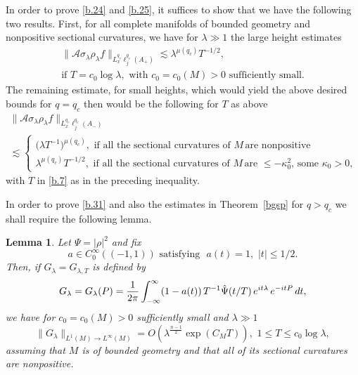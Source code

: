 \documentclass[10pt]{amsart}
\newtheorem{lemma}[theorem]{Lemma}
\newcommand{\la}{\lambda}
\newcommand{\1}{{\bf 1}}
\newcommand{\A}{{\mathcal A}}
\begin{document}
In order to prove \eqref{b.24} and \eqref{b.25},
it suffices to show that
we have the following two results.  First, for
all complete manifolds of bounded 
geometry and  nonpositive 
sectional curvatures, we have for $\la \gg 1$
the large height estimates
\begin{multline}\label{b.31}
\|\A \sigma_\la\rho_\la f\|_{L^{q_c}_x
\ell_j^{q_c}(A_+)}
\lesssim \la^{\mu(q_c)}T^{-1/2}, 
\\ \text{if } T=c_0\log\la,
\, \, 
\text{with }c_0=c_0(M)>0 \, 
\, \text{sufficiently small.}
\end{multline}
The remaining estimate, for small heights, 
which would yield the above
desired bounds for $q=q_c$ then would be the following
for $T$ as above
\begin{multline}\label{b.32}
\|\A \sigma_\la\rho_\la f\|_{L^{q_c}_x
\ell_j^{q_c}(A_-)}
\\
\lesssim
\begin{cases}
\bigl(\la T^{-1}\bigr)^{\mu(q_c)}, 
\, \, \text{if all the sectional curvatures of } 
M \, \text{are nonpositive}
\\
\la^{\mu(q_c)}T^{-1/2}, 
\, \, \text{if all the sectional curvatures of } 
M \, \text{are } \le -\kappa_0^2, \,
\text{some }\kappa_0>0,
\end{cases}
\end{multline}
with $T$ in \eqref{b.7} as in the preceding inequality.


In order to prove \eqref{b.31} and also the estimates
in Theorem~\ref{bgsp} for $q>q_c$ we shall require
the following lemma.


\begin{lemma}\label{Gl}
Let $\Psi=|\rho|^2$ and fix 
$$a\in C^\infty_0((-1,1)) \, \, 
\text{satisfying } \, \, a(t)=1, \, \, 
|t|\le 1/2.$$
Then, if $G_\la=G_{\la,T}$ is defined by
\begin{equation}\label{b.33}
G_\la=G_\la(P)
=\frac1{2\pi}\int_{-\infty}^\infty
(1-a(t))
\, T^{-1}\Hat \Psi(t/T) \,
e^{it\la} \, e^{-itP} \, dt, 
\end{equation}
we have for $c_0=c_0(M)>0$ sufficiently small
and $\la\gg 1$
\begin{equation}\label{b.34}
\|G_\la\|_{L^1(M)\to L^\infty(M)}= 
O(\la^{\frac{n-1}2}\exp(C_MT)),
\, \, 1\le T\le c_0\log\la,
\end{equation}
assuming that $M$ is of bounded geometry and that
all of its sectional curvatures are nonpositive.
\end{lemma}
\end{document}
